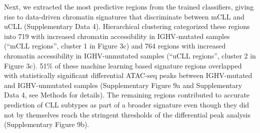 \documentclass[10pt,]{article}
\begin{document}
Next, we extracted the most predictive regions from the trained
classifiers, giving rise to data-driven chromatin signatures that
discriminate between mCLL and uCLL (Supplementary Data 4). Hierarchical
clustering categorized these regions into 719 with increased chromatin
accessibility in IGHV-mutated samples (``mCLL regions'', cluster 1 in
Figure 3c) and 764 regions with increased chromatin accessibility in
IGHV-unmutated samples (``uCLL regions'', cluster 2 in Figure 3c). 51\%
of these machine learning based signature regions overlapped with
statistically significant differential ATAC-seq peaks between
IGHV-mutated and IGHV-unmutated samples (Supplementary Figure 9a and
Supplementary Data 4, see Methods for details). The remaining regions
contributed to accurate prediction of CLL subtypes as part of a broader
signature even though they did not by themselves reach the stringent
thresholds of the differential peak analysis (Supplementary Figure 9b).
\end{document}
